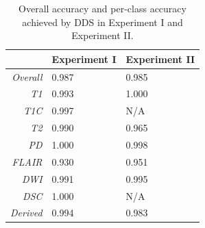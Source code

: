 \begin{table}[htbp]
 \centering
  \caption{Overall accuracy and per-class accuracy achieved by \gls{DDS} in Experiment I and Experiment II.}
  \label{tab:seqacc}
  \begin{tabular}{rC{4cm}C{3cm}}
      \toprule
& \textbf{Experiment I} & \textbf{Experiment II}\\
    \midrule
  \textit{Overall}    & 0.987 & 0.985\\
  \textit{\gls{T1}}        & 0.993 & 1.000\\
  \textit{\gls{T1C}}       & 0.997 & N/A\\
  \textit{\gls{T2}}        & 0.990 & 0.965\\
  \textit{\gls{PD}}        & 1.000 & 0.998\\
  \textit{\gls{FLAIR}}  & 0.930 & 0.951\\
  \textit{\gls{DWI}}        & 0.991 & 0.995\\
  \textit{\gls{DSC}}    & 1.000 & N/A\\
  \textit{Derived}    & 0.994 & 0.983\\
  \bottomrule
  \end{tabular}
\end{table}


